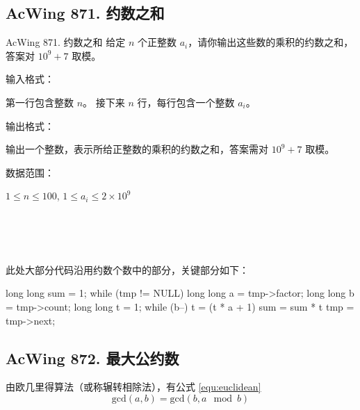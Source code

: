 \subsection{AcWing 871. 约数之和}
\begin{titledbox}{AcWing 871. 约数之和}
    给定 $n$ 个正整数 $a_i$，请你输出这些数的乘积的约数之和，答案对 $10^9+7$ 取模。

    输入格式：

    第一行包含整数 $n$。 接下来 $n$ 行，每行包含一个整数 $a_i$。

    输出格式：

    输出一个整数，表示所给正整数的乘积的约数之和，答案需对 $10^9+7$ 取模。

    数据范围：

    $1 \le n \le 100$, $1 \le a_i \le 2 \times 10^9$

    \begin{inputblock}
         \\
         \\
         \\
    \end{inputblock}
    \begin{outputblock}
    \end{outputblock}
\end{titledbox}

此处大部分代码沿用约数个数中的部分，关键部分如下：

\begin{mycpponecol}[约数之和]
    long long sum = 1;
    while (tmp != NULL) {
        long long a = tmp->factor;
        long long b = tmp->count;
        long long t = 1;
        while (b--) {
            t = (t * a + 1) %
        }
        sum = sum * t %
        tmp = tmp->next;
    }
\end{mycpponecol}

\subsection{AcWing 872. 最大公约数}
由欧几里得算法（或称辗转相除法），有公式 \ref{equ:euclidean}
\begin{equation}
    \text{gcd}(a, b) = \text{gcd}(b, a \mod b)
\end{equation}

